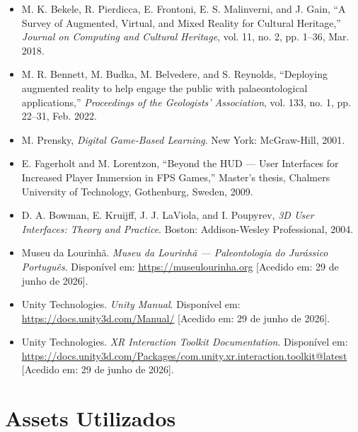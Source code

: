 \documentclass[a4paper,11pt]{report}
\newcommand{\blankpage}{%
    \newpage
    \thispagestyle{empty}
    \mbox{}
    \newpage
}
\begin{document}
\begin{itemize}
    \item M. K. Bekele, R. Pierdicca, E. Frontoni, E. S. Malinverni, and J. Gain,
    ``A Survey of Augmented, Virtual, and Mixed Reality for Cultural Heritage,''
    \textit{Journal on Computing and Cultural Heritage}, vol. 11, no. 2,
    pp. 1--36, Mar. 2018.

    \item M. R. Bennett, M. Budka, M. Belvedere, and S. Reynolds,
    ``Deploying augmented reality to help engage the public with
    palaeontological applications,''
    \textit{Proceedings of the Geologists' Association}, vol. 133, no. 1,
    pp. 22--31, Feb. 2022.

    \item M. Prensky, \textit{Digital Game-Based Learning}.
    New York: McGraw-Hill, 2001.

    \item E. Fagerholt and M. Lorentzon,
    ``Beyond the HUD --- User Interfaces for Increased Player Immersion in
    FPS Games,'' Master's thesis, Chalmers University of Technology,
    Gothenburg, Sweden, 2009.

    \item D. A. Bowman, E. Kruijff, J. J. LaViola, and I. Poupyrev,
    \textit{3D User Interfaces: Theory and Practice}.
    Boston: Addison-Wesley Professional, 2004.

    \item Museu da Lourinhã. \textit{Museu da Lourinhã --- Paleontologia do
    Jurássico Português}. Disponível em:
    \url{https://museulourinha.org}
    [Acedido em: 29 de junho de 2026].

    \item Unity Technologies. \textit{Unity Manual}. Disponível em:
    \url{https://docs.unity3d.com/Manual/}
    [Acedido em: 29 de junho de 2026].

    \item Unity Technologies. \textit{XR Interaction Toolkit Documentation}.
    Disponível em:
    \url{https://docs.unity3d.com/Packages/com.unity.xr.interaction.toolkit@latest}
    [Acedido em: 29 de junho de 2026].
\end{itemize}

\blankpage

\chapter*{Assets Utilizados}
\end{document}
